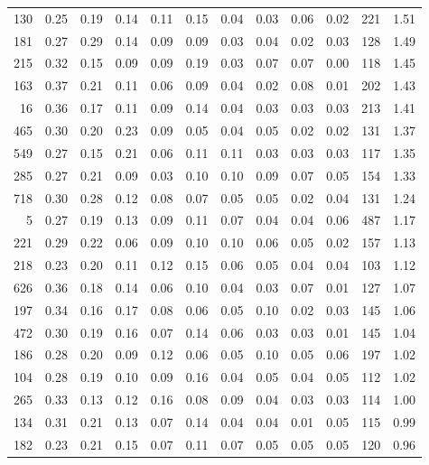 \begin{tabular}{rrrrrrrrrrll}
          130 & 0.25 & 0.19 & 0.14 & 0.11 & 0.15 & 0.04 & 0.03 & 0.06 & 0.02 & 221 &  1.51 \\
          181 & 0.27 & 0.29 & 0.14 & 0.09 & 0.09 & 0.03 & 0.04 & 0.02 & 0.03 & 128 &  1.49 \\
          215 & 0.32 & 0.15 & 0.09 & 0.09 & 0.19 & 0.03 & 0.07 & 0.07 & 0.00 & 118 &  1.45 \\
          163 & 0.37 & 0.21 & 0.11 & 0.06 & 0.09 & 0.04 & 0.02 & 0.08 & 0.01 & 202 &  1.43 \\
           16 & 0.36 & 0.17 & 0.11 & 0.09 & 0.14 & 0.04 & 0.03 & 0.03 & 0.03 & 213 &  1.41 \\
          465 & 0.30 & 0.20 & 0.23 & 0.09 & 0.05 & 0.04 & 0.05 & 0.02 & 0.02 & 131 &  1.37 \\
          549 & 0.27 & 0.15 & 0.21 & 0.06 & 0.11 & 0.11 & 0.03 & 0.03 & 0.03 & 117 &  1.35 \\
          285 & 0.27 & 0.21 & 0.09 & 0.03 & 0.10 & 0.10 & 0.09 & 0.07 & 0.05 & 154 &  1.33 \\
          718 & 0.30 & 0.28 & 0.12 & 0.08 & 0.07 & 0.05 & 0.05 & 0.02 & 0.04 & 131 &  1.24 \\
            5 & 0.27 & 0.19 & 0.13 & 0.09 & 0.11 & 0.07 & 0.04 & 0.04 & 0.06 & 487 &  1.17 \\
          221 & 0.29 & 0.22 & 0.06 & 0.09 & 0.10 & 0.10 & 0.06 & 0.05 & 0.02 & 157 &  1.13 \\
          218 & 0.23 & 0.20 & 0.11 & 0.12 & 0.15 & 0.06 & 0.05 & 0.04 & 0.04 & 103 &  1.12 \\
          626 & 0.36 & 0.18 & 0.14 & 0.06 & 0.10 & 0.04 & 0.03 & 0.07 & 0.01 & 127 &  1.07 \\
          197 & 0.34 & 0.16 & 0.17 & 0.08 & 0.06 & 0.05 & 0.10 & 0.02 & 0.03 & 145 &  1.06 \\
          472 & 0.30 & 0.19 & 0.16 & 0.07 & 0.14 & 0.06 & 0.03 & 0.03 & 0.01 & 145 &  1.04 \\
          186 & 0.28 & 0.20 & 0.09 & 0.12 & 0.06 & 0.05 & 0.10 & 0.05 & 0.06 & 197 &  1.02 \\
          104 & 0.28 & 0.19 & 0.10 & 0.09 & 0.16 & 0.04 & 0.05 & 0.04 & 0.05 & 112 &  1.02 \\
          265 & 0.33 & 0.13 & 0.12 & 0.16 & 0.08 & 0.09 & 0.04 & 0.03 & 0.03 & 114 &  1.00 \\
          134 & 0.31 & 0.21 & 0.13 & 0.07 & 0.14 & 0.04 & 0.04 & 0.01 & 0.05 & 115 &  0.99 \\
          182 & 0.23 & 0.21 & 0.15 & 0.07 & 0.11 & 0.07 & 0.05 & 0.05 & 0.05 & 120 &  0.96 \\

\end{tabular}
